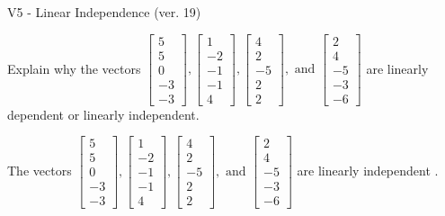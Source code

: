 \begin{exercise}
  \begin{exerciseTitle}V5 - Linear Independence (ver. 19)\end{exerciseTitle}
  \begin{exerciseStatement}
    Explain why the vectors \(\left[\begin{array}{r}
5 \\
5 \\
0 \\
-3 \\
-3
\end{array}\right] , \left[\begin{array}{r}
1 \\
-2 \\
-1 \\
-1 \\
4
\end{array}\right] , \left[\begin{array}{r}
4 \\
2 \\
-5 \\
2 \\
2
\end{array}\right] , \text{ and } \left[\begin{array}{r}
2 \\
4 \\
-5 \\
-3 \\
-6
\end{array}\right]\) are linearly dependent or linearly independent.	


  \end{exerciseStatement}
  \begin{exerciseAnswer}
   The vectors \(\left[\begin{array}{r}
5 \\
5 \\
0 \\
-3 \\
-3
\end{array}\right] , \left[\begin{array}{r}
1 \\
-2 \\
-1 \\
-1 \\
4
\end{array}\right] , \left[\begin{array}{r}
4 \\
2 \\
-5 \\
2 \\
2
\end{array}\right] , \text{ and } \left[\begin{array}{r}
2 \\
4 \\
-5 \\
-3 \\
-6
\end{array}\right]\) are 
  	 linearly independent  .
  


  \end{exerciseAnswer}
\end{exercise}